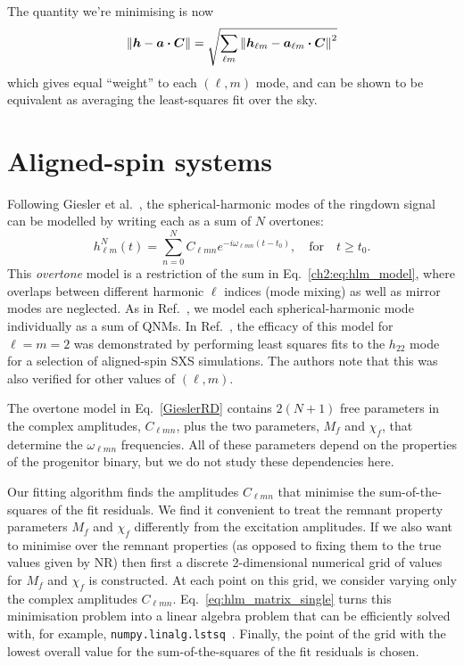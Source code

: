 The quantity we're minimising is now
\begin{equation}
    \norm{\vb*{h} - \vb*{a} \vdot \vb*{C}} = \sqrt{ \sum_{\ell m} \norm{\vb*{h}_{\ell m} - \vb*{a}_{\ell m} \vdot \vb*{C}}^2 }
\end{equation}
which gives equal ``weight'' to each $(\ell,m)$ mode, and can be shown to be equivalent as averaging the least-squares fit over the sky.

\section{Aligned-spin systems}\label{aligned-spin-section}

Following Giesler et al.~\cite{Giesler:2019uxc}, the spherical-harmonic modes of the ringdown signal can be modelled by writing each as a sum of $N$ overtones:
\begin{equation}\label{GieslerRD}
    h_{\ell m}^N(t) = \sum_{n=0}^N C_{\ell m n} e^{-i\omega_{\ell m n}(t-t_0)}, \quad \textrm{for} \quad t \geq t_0.
\end{equation}
This \emph{overtone} model is a restriction of the sum in Eq.~\ref{ch2:eq:hlm_model}, where overlaps between different harmonic $\ell$ indices (mode mixing) as well as mirror modes are neglected. 
As in Ref.~\cite{Giesler:2019uxc}, we model each spherical-harmonic mode individually as a sum of QNMs.
In Ref.~\cite{Giesler:2019uxc}, the efficacy of this model for $\ell=m=2$ was demonstrated by performing least squares fits to the $h_{22}$ mode for a selection of aligned-spin SXS simulations. The authors note that this was also verified for other values of $(\ell,m)$.

The overtone model in Eq.~\ref{GieslerRD} contains $2(N+1)$ free parameters in the complex amplitudes, $C_{\ell m n}$, plus the two parameters, $M_f$ and $\chi_f$, that determine the $\omega_{\ell m n}$ frequencies.
All of these parameters depend on the properties of the progenitor binary, but we do not study these dependencies here.

Our fitting algorithm finds the amplitudes $C_{\ell m n}$ that minimise the sum-of-the-squares of the fit residuals.
We find it convenient to treat the remnant property parameters $M_f$ and $\chi_f$ differently from the excitation amplitudes. 
If we also want to minimise over the remnant properties (as opposed to fixing them to the true values given by NR) then first a discrete 2-dimensional numerical grid of values for $M_f$ and $\chi_f$ is constructed.
At each point on this grid, we consider varying only the complex amplitudes $C_{\ell m n}$. 
Eq.~\ref{eq:hlm_matrix_single} turns this minimisation problem into a linear algebra problem that can be efficiently solved with, for example, \texttt{numpy.linalg.lstsq}~\cite{Harris:2020xlr}.
Finally, the point of the grid with the lowest overall value for the sum-of-the-squares of the fit residuals is chosen.

